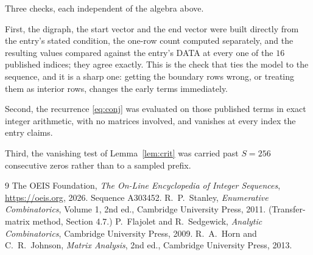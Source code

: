 \documentclass[11pt,a4paper]{article}
\theoremstyle{plain}
\theoremstyle{definition}
\begin{document}
Three checks, each independent of the algebra above.

First, the digraph, the start vector and the end vector were built directly from the
entry's stated condition, the one-row count computed separately, and the resulting values
compared against the entry's DATA at every one of the $16$ published indices; they
agree exactly. This is the check that ties the model to the sequence, and it is a sharp one:
getting the boundary rows wrong, or treating them as interior rows, changes the early terms
immediately.

Second, the recurrence \eqref{eq:conj} was evaluated on those published terms in exact
integer arithmetic, with no matrices involved, and vanishes at every index the entry claims.

Third, the vanishing test of Lemma~\ref{lem:crit} was carried past $S=256$ consecutive
zeros rather than to a sampled prefix.

\begin{thebibliography}{9}
 The OEIS Foundation, \emph{The On-Line Encyclopedia of Integer
Sequences}, \url{https://oeis.org}, 2026. Sequence A303452.
 R.~P.~Stanley, \emph{Enumerative Combinatorics}, Volume 1, 2nd ed.,
Cambridge University Press, 2011. (Transfer-matrix method, Section 4.7.)
 P.~Flajolet and R.~Sedgewick, \emph{Analytic Combinatorics}, Cambridge
University Press, 2009.
 R.~A.~Horn and C.~R.~Johnson, \emph{Matrix Analysis}, 2nd ed., Cambridge
University Press, 2013.
\end{thebibliography}
\end{document}
